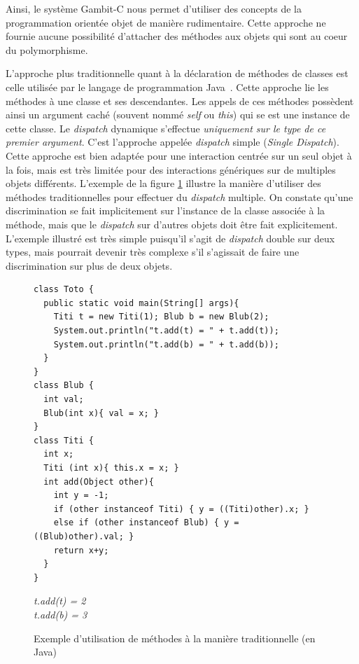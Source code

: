 \documentclass[12pt,twoside,letterpaper,francais]{book}
\begin{document}
Ainsi, le système Gambit-C nous permet d'utiliser des concepts de la
programmation orientée objet de manière rudimentaire. Cette approche
ne fournie aucune possibilité d'attacher des méthodes aux objets qui
sont au coeur du polymorphisme.

L'approche plus traditionnelle quant à la déclaration de méthodes de
classes est celle utilisée par le langage de programmation
Java~\cite{JavaSpec}. Cette approche lie les méthodes à une classe et
ses descendantes. Les appels de ces méthodes possèdent ainsi un
argument caché (souvent nommé \textit{self} ou \textit{this}) qui se
est une instance de cette classe. Le \textit{dispatch} dynamique
s'effectue \emph{uniquement sur le type de ce premier argument}. C'est
l'approche appelée \textit{dispatch} simple (\textit{Single
  Dispatch}). Cette approche est bien adaptée pour une interaction
centrée sur un seul objet à la fois, mais est très limitée pour des
interactions génériques sur de multiples objets différents. L'exemple
de la figure \ref{OO:JavaDispatch} illustre la manière d'utiliser des
méthodes traditionnelles pour effectuer du \textit{dispatch}
multiple. On constate qu'une discrimination se fait implicitement sur
l'instance de la classe associée à la méthode, mais que le
\textit{dispatch} sur d'autres objets doit être fait
explicitement. L'exemple illustré est très simple puisqu'il s'agit de
\textit{dispatch} double sur deux types, mais pourrait devenir très
complexe s'il s'agissait de faire une discrimination sur plus de deux
objets.\\

\begin{figure}[h!]
  \begin{verbatim}
class Toto {
  public static void main(String[] args){
    Titi t = new Titi(1); Blub b = new Blub(2);
    System.out.println("t.add(t) = " + t.add(t));
    System.out.println("t.add(b) = " + t.add(b));
  }
} 
class Blub {
  int val;
  Blub(int x){ val = x; }
}
class Titi {
  int x;
  Titi (int x){ this.x = x; }
  int add(Object other){
    int y = -1;
    if (other instanceof Titi) { y = ((Titi)other).x; }
    else if (other instanceof Blub) { y = ((Blub)other).val; }
    return x+y;
  }
}
  \end{verbatim}
  {{\it
t.add(t) = 2\\
t.add(b) = 3
  }}
  \caption{Exemple d'utilisation de méthodes à la manière
    traditionnelle (en Java)}
  \label{OO:JavaDispatch}
\end{figure}

\FloatBarrier
\end{document}

